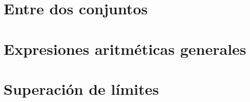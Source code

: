 \documentclass[a4paper,12pt,twoside]{book}
\begin{document}
\chapter{Entre dos conjuntos}
\label{121218}

\chapter{Expresiones aritméticas generales}
\label{131218}

\chapter{Superación de límites}
\label{141218}

\end{document}
